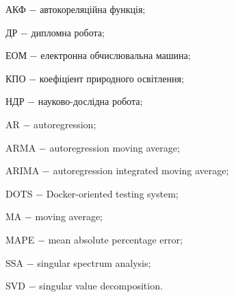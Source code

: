 

\hspace*{26pt} АКФ $-$ автокореляційна функція;

ДР $-$ дипломна робота;

ЕОМ $-$ електронна обчислювальна машина;

КПО $-$ коефіціент природного освітлення;

НДР $-$ науково-дослідна робота;

AR $-$ autoregression;

ARMA $-$ autoregression moving average;

ARIMA $-$ autoregression integrated moving average;

DOTS $-$ Docker-oriented testing system;

MA $-$ moving average;

MAPE $-$ mean absolute percentage error; 

SSA $-$ singular spectrum analysis;

SVD $-$ singular value decomposition.

